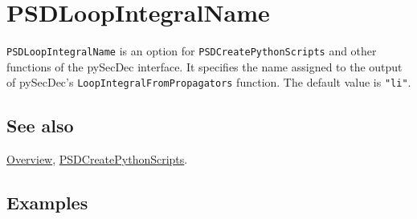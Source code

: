 \documentclass[../FeynHelpersManual.tex]{subfiles}
\begin{document}
\hypertarget{psdloopintegralname}{
\section{PSDLoopIntegralName}\label{psdloopintegralname}}

\texttt{PSDLoopIntegralName} is an option for
\texttt{PSDCreatePythonScripts} and other functions of the pySecDec
interface. It specifies the name assigned to the output of pySecDec's
\texttt{LoopIntegralFromPropagators} function. The default value is
\texttt{"li"}.

\subsection{See also}

\hyperlink{toc}{Overview},
\hyperlink{psdcreatepythonscripts}{PSDCreatePythonScripts}.

\subsection{Examples}
\end{document}
